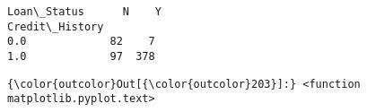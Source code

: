 \documentclass[11pt]{article}
\begin{document}
    \begin{Verbatim}[commandchars=\\\{\}]
Loan\_Status      N    Y
Credit\_History         
0.0             82    7
1.0             97  378

    \end{Verbatim}

\begin{Verbatim}[commandchars=\\\{\}]
{\color{outcolor}Out[{\color{outcolor}203}]:} <function matplotlib.pyplot.text>
\end{Verbatim}
            
    \begin{center}
    \end{center}
    { \hspace*{\fill} \\}
    
\end{document}
